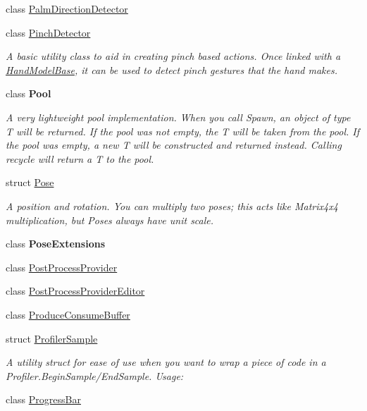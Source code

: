 \begin{DoxyCompactItemize}
class \mbox{\hyperlink{class_leap_1_1_unity_1_1_palm_direction_detector}{Palm\+Direction\+Detector}}
\item 
class \mbox{\hyperlink{class_leap_1_1_unity_1_1_pinch_detector}{Pinch\+Detector}}
\begin{DoxyCompactList}\small\item\em A basic utility class to aid in creating pinch based actions. Once linked with a \mbox{\hyperlink{class_leap_1_1_unity_1_1_hand_model_base}{Hand\+Model\+Base}}, it can be used to detect pinch gestures that the hand makes. \end{DoxyCompactList}\item 
class {\bfseries Pool}
\begin{DoxyCompactList}\small\item\em A very lightweight pool implementation. When you call Spawn, an object of type T will be returned. If the pool was not empty, the T will be taken from the pool. If the pool was empty, a new T will be constructed and returned instead. Calling recycle will return a T to the pool. \end{DoxyCompactList}\item 
struct \mbox{\hyperlink{struct_leap_1_1_unity_1_1_pose}{Pose}}
\begin{DoxyCompactList}\small\item\em A position and rotation. You can multiply two poses; this acts like Matrix4x4 multiplication, but Poses always have unit scale. \end{DoxyCompactList}\item 
class {\bfseries Pose\+Extensions}
\item 
class \mbox{\hyperlink{class_leap_1_1_unity_1_1_post_process_provider}{Post\+Process\+Provider}}
\item 
class \mbox{\hyperlink{class_leap_1_1_unity_1_1_post_process_provider_editor}{Post\+Process\+Provider\+Editor}}
\item 
class \mbox{\hyperlink{class_leap_1_1_unity_1_1_produce_consume_buffer}{Produce\+Consume\+Buffer}}
\item 
struct \mbox{\hyperlink{struct_leap_1_1_unity_1_1_profiler_sample}{Profiler\+Sample}}
\begin{DoxyCompactList}\small\item\em A utility struct for ease of use when you want to wrap a piece of code in a Profiler.\+Begin\+Sample/\+End\+Sample. Usage\+: \end{DoxyCompactList}\item 
class \mbox{\hyperlink{class_leap_1_1_unity_1_1_progress_bar}{Progress\+Bar}}

\end{DoxyCompactItemize}
